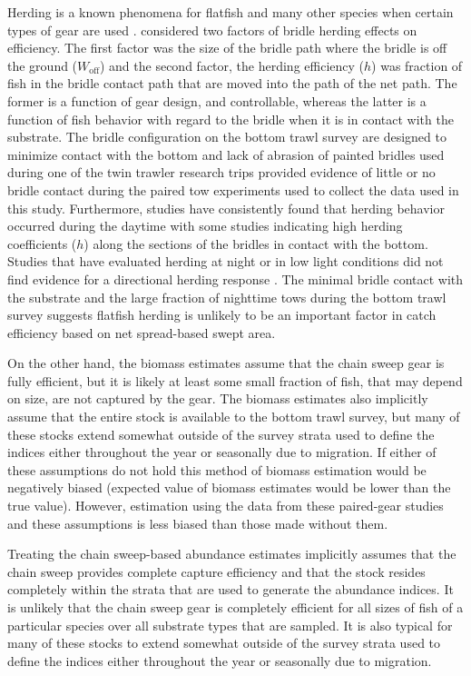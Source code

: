 \documentclass[
  12pt,
]{article}
\begin{document}
Herding is a known phenomena for flatfish and many other species when
certain types of gear are used
\citep{rammxiao95,somertonmunro01,somertonetal07,roseetal10}.
\citet{somertonmunro01} considered two factors of bridle herding effects
on efficiency. The first factor was the size of the bridle path where
the bridle is off the ground (\(W_\text{off}\)) and the second factor,
the herding efficiency (\(h\)) was fraction of fish in the bridle
contact path that are moved into the path of the net path. The former is
a function of gear design, and controllable, whereas the latter is a
function of fish behavior with regard to the bridle when it is in
contact with the substrate. The bridle configuration on the bottom trawl
survey are designed to minimize contact with the bottom and lack of
abrasion of painted bridles used during one of the twin trawler research
trips provided evidence of little or no bridle contact during the paired
tow experiments used to collect the data used in this study.
Furthermore, studies have consistently found that herding behavior
occurred during the daytime
\citep{glasswardle89,somertonmunro01,ryerbarnett06,bryanetal14,ryeretal10,deanetal21}
with some studies indicating high herding coefficients (\(h\)) along the
sections of the bridles in contact with the bottom. Studies that have
evaluated herding at night or in low light conditions did not find
evidence for a directional herding response
\citep{glasswardle89,ryerbarnett06,ryer08,ryeretal10}. The minimal
bridle contact with the substrate and the large fraction of nighttime
tows during the bottom trawl survey suggests flatfish herding is
unlikely to be an important factor in catch efficiency based on net
spread-based swept area.

On the other hand, the biomass estimates assume that the chain sweep
gear is fully efficient, but it is likely at least some small fraction
of fish, that may depend on size, are not captured by the gear. The
biomass estimates also implicitly assume that the entire stock is
available to the bottom trawl survey, but many of these stocks extend
somewhat outside of the survey strata used to define the indices either
throughout the year or seasonally due to migration. If either of these
assumptions do not hold this method of biomass estimation would be
negatively biased (expected value of biomass estimates would be lower
than the true value). However, estimation using the data from these
paired-gear studies and these assumptions is less biased than those made
without them.

Treating the chain sweep-based abundance estimates implicitly assumes
that the chain sweep provides complete capture efficiency and that the
stock resides completely within the strata that are used to generate the
abundance indices. It is unlikely that the chain sweep gear is
completely efficient for all sizes of fish of a particular species over
all substrate types that are sampled. It is also typical for many of
these stocks to extend somewhat outside of the survey strata used to
define the indices either throughout the year or seasonally due to
migration.
\end{document}
